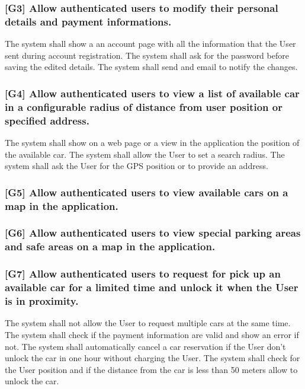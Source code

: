\subsubsection{{[}G3{]} Allow authenticated users to modify their personal details and payment informations.}
\begin{itemize}
	\reqcounter The system shall show a an account page with all the information that the User sent during 
	account registration.
	\reqcounter The system shall ask for the password before saving the edited details.
	\reqcounter The system shall send and email to notify the changes.
\end{itemize}



\subsubsection{{[}G4{]} Allow authenticated users to view a list of available car in a configurable radius of 
	distance from user position or specified address.}
\begin{itemize}
	\reqcounter The system shall show on a web page or a view in the application the position of the available car.
	\reqcounter The system shall allow the User to set a search radius.
	\reqcounter The system shall ask the User for the GPS position or to provide an address.
\end{itemize}

\subsubsection{{[}G5{]} Allow authenticated users to view available cars on a map in the
	application.}

\subsubsection{{[}G6{]} Allow authenticated users to view special parking areas and safe areas on a map in
	the application.}

\subsubsection{{[}G7{]} Allow authenticated users to request for pick up an available car for a limited time and
	unlock it when the User is in proximity.}
\begin{itemize}
	\reqcounter The system shall not allow the User to request multiple cars at the same time.
	\reqcounter The system shall check if the payment information are valid and show an error if not.
	\reqcounter The system shall automatically cancel a car reservation if the User don't unlock the car in one hour without charging the User.
	\reqcounter The system shall check for the User position and if the distance from the car is less than 50 meters
	allow to unlock the car.
\end{itemize}

